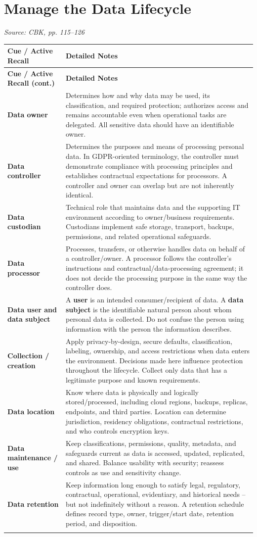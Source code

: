 \documentclass[10pt,letterpaper]{article}
\makeatletter
\newenvironment{cornell}
{\rowcolors{2}{white}{notebg}\begin{longtable}{@{}>{\raggedright\arraybackslash\columncolor{cuebg}\color{navy}\bfseries}p{0.285\textwidth}>{\raggedright\arraybackslash}p{0.65\textwidth}@{}}
\rowcolor{navy}\color{white}\textbf{Cue / Active Recall} & \color{white}\textbf{Detailed Notes}\\ \hline\endfirsthead
\rowcolor{navy}\color{white}\textbf{Cue / Active Recall (cont.)} & \color{white}\textbf{Detailed Notes}\\ \hline\endhead}{\end{longtable}}
\newcommand{\noterow}[2]{#1 & #2\\\arrayrulecolor{line}\hline}
\newcommand{\source}[1]{\par{\footnotesize\color{teal}\textit{Source: CBK, #1}}\par}
\makeatother
\begin{document}
\section{\color{navy}Manage the Data Lifecycle}
\source{pp. 115--126}
\begin{cornell}
\noterow{Data owner}{Determines how and why data may be used, its classification, and required protection; authorizes access and remains accountable even when operational tasks are delegated. All sensitive data should have an identifiable owner.}
\noterow{Data controller}{Determines the purposes and means of processing personal data. In GDPR-oriented terminology, the controller must demonstrate compliance with processing principles and establishes contractual expectations for processors. A controller and owner can overlap but are not inherently identical.}
\noterow{Data custodian}{Technical role that maintains data and the supporting IT environment according to owner/business requirements. Custodians implement safe storage, transport, backups, permissions, and related operational safeguards.}
\noterow{Data processor}{Processes, transfers, or otherwise handles data on behalf of a controller/owner. A processor follows the controller's instructions and contractual/data-processing agreement; it does not decide the processing purpose in the same way the controller does.}
\noterow{Data user and data subject}{A \textbf{user} is an intended consumer/recipient of data. A \textbf{data subject} is the identifiable natural person about whom personal data is collected. Do not confuse the person using information with the person the information describes.}
\noterow{Collection / creation}{Apply privacy-by-design, secure defaults, classification, labeling, ownership, and access restrictions when data enters the environment. Decisions made here influence protection throughout the lifecycle. Collect only data that has a legitimate purpose and known requirements.}
\noterow{Data location}{Know where data is physically and logically stored/processed, including cloud regions, backups, replicas, endpoints, and third parties. Location can determine jurisdiction, residency obligations, contractual restrictions, and who controls encryption keys.}
\noterow{Data maintenance / use}{Keep classifications, permissions, quality, metadata, and safeguards current as data is accessed, updated, replicated, and shared. Balance usability with security; reassess controls as use and sensitivity change.}
\noterow{Data retention}{Keep information long enough to satisfy legal, regulatory, contractual, operational, evidentiary, and historical needs -- but not indefinitely without a reason. A retention schedule defines record type, owner, trigger/start date, retention period, and disposition.}

\end{cornell}
\end{document}
